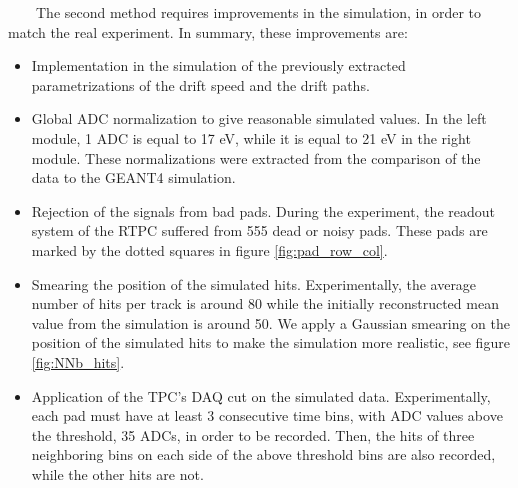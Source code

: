 ~~~~The second method requires improvements in the simulation, in order to match the real experiment. In summary, these improvements are:
\begin{itemize}
\item Implementation in the simulation of the previously extracted parametrizations of the drift speed and the drift paths.
\item Global ADC normalization to give reasonable simulated values. In the left module, 1 ADC is equal to 
17 eV, while it is equal to 21 eV in the right module. These normalizations were extracted from the comparison of the data to the GEANT4 simulation.
\item Rejection of the signals from bad pads. During the experiment, the readout system of the RTPC suffered from 555 dead or noisy pads. These pads are marked by the dotted squares in figure \ref{fig:pad_row_col}.
\item Smearing the position of the simulated hits. Experimentally, the average number of hits per track is around 80 while the initially reconstructed mean value from the simulation is around 50. We apply a Gaussian smearing on the position of the simulated hits to make the simulation more realistic, see figure \ref{fig:NNb_hits}. 

\item Application of the TPC's DAQ cut on the simulated data. Experimentally, each pad must have at least 3 consecutive time bins, with ADC values above the threshold, 35 ADCs, in order to be recorded. Then, the hits of three neighboring bins on each side of the above threshold bins are also recorded, while the other hits are not.
\end{itemize} 

